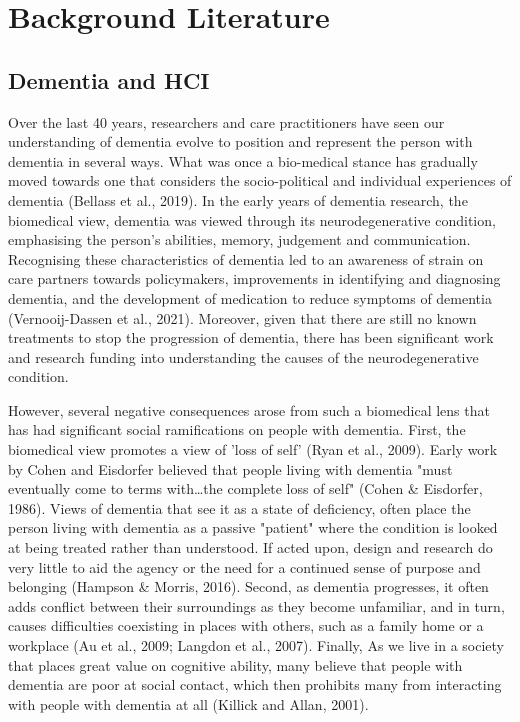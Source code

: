 \chapter{Background Literature}
\label{BackgroundLit}


\section{Dementia and HCI}
\label{BL:DementiaHCI}
Over the last 40 years, researchers and care practitioners have seen our understanding of dementia evolve to position and represent the person with dementia in several ways. What was once a bio-medical stance has gradually moved towards one that considers the socio-political and individual experiences of dementia (Bellass et al., 2019). In the early years of dementia research, the biomedical view, dementia was viewed through its neurodegenerative condition, emphasising the person's abilities, memory, judgement and communication. Recognising these characteristics of dementia led to an awareness of strain on care partners towards policymakers, improvements in identifying and diagnosing dementia, and the development of medication to reduce symptoms of dementia (Vernooij-Dassen et al., 2021). Moreover, given that there are still no known treatments to stop the progression of dementia, there has been significant work and research funding into understanding the causes of the neurodegenerative condition.

However, several negative consequences arose from such a biomedical lens that has had significant social ramifications on people with dementia. First, the biomedical view promotes a view of 'loss of self' (Ryan et al., 2009). Early work by Cohen and Eisdorfer believed that people living with dementia "must eventually come to terms with…the complete loss of self" (Cohen & Eisdorfer, 1986). Views of dementia that see it as a state of deficiency, often place the person living with dementia as a passive "patient" where the condition is looked at being treated rather than understood. If acted upon, design and research do very little to aid the agency or the need for a continued sense of purpose and belonging (Hampson & Morris, 2016). Second, as dementia progresses, it often adds conflict between their surroundings as they become unfamiliar, and in turn, causes difficulties coexisting in places with others, such as a family home or a workplace (Au et al., 2009; Langdon et al., 2007). Finally, As we live in a society that places great value on cognitive ability, many believe that people with dementia are poor at social contact, which then prohibits many from interacting with people with dementia at all (Killick and Allan, 2001).

